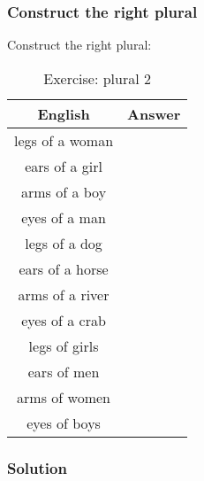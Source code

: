 \subsubsection{Construct the right plural}

Construct the right plural:
\begin{table}[H]
\centering
\begin{tabular}{|c|M{10.0cm}|}
  \toprule
  \textbf{English} & \textbf{Answer}\\
  \toprule
  legs of a woman & \\
  \midrule
  ears of a girl & \\
  \midrule
  arms of a boy & \\
  \midrule
  eyes of a man & \\
  \midrule
  legs of a dog & \\
  \midrule
  ears of a horse & \\
  \midrule
  arms of a river & \\
  \midrule
  eyes of a crab & \\
  \midrule
  legs of girls & \\
  \midrule
  ears of men & \\
  \midrule
  arms of women & \\
  \midrule
  eyes of boys & \\
  \bottomrule
\end{tabular}
\label{exercise_plural_2}
\caption{Exercise: plural 2}
\end{table}

\newpage
\subsubsection{Solution}

